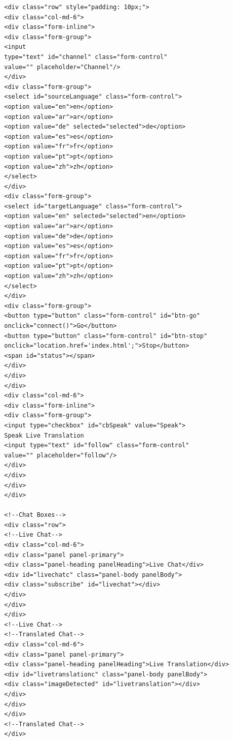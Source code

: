 \documentclass[english,runningheads,a4paper]{llncs}[2018/03/10]
\begin{document}
{\begin{verbatim}
        <div class="row" style="padding: 10px;">
        <div class="col-md-6">
        <div class="form-inline">
        <div class="form-group">
        <input 
        type="text" id="channel" class="form-control" 
        value="" placeholder="Channel"/>
        </div>
        <div class="form-group">
        <select id="sourceLanguage" class="form-control">
        <option value="en">en</option>
        <option value="ar">ar</option>
        <option value="de" selected="selected">de</option>
        <option value="es">es</option>
        <option value="fr">fr</option>
        <option value="pt">pt</option>
        <option value="zh">zh</option>
        </select>
        </div>
        <div class="form-group">
        <select id="targetLanguage" class="form-control">
        <option value="en" selected="selected">en</option>
        <option value="ar">ar</option>
        <option value="de">de</option>
        <option value="es">es</option>
        <option value="fr">fr</option>
        <option value="pt">pt</option>
        <option value="zh">zh</option>
        </select>
        </div>
        <div class="form-group">
        <button type="button" class="form-control" id="btn-go" 
        onclick="connect()">Go</button>
        <button type="button" class="form-control" id="btn-stop"
        onclick="location.href='index.html';">Stop</button>
        <span id="status"></span>
        </div>
        </div>
        </div>
        <div class="col-md-6">
        <div class="form-inline">
        <div class="form-group">
        <input type="checkbox" id="cbSpeak" value="Speak"> 
        Speak Live Translation
        <input type="text" id="follow" class="form-control" 
        value="" placeholder="follow"/>
        </div>
        </div>
        </div>
        </div>
        
        <!--Chat Boxes-->
        <div class="row">
        <!--Live Chat-->
        <div class="col-md-6">
        <div class="panel panel-primary">
        <div class="panel-heading panelHeading">Live Chat</div>
        <div id="livechatc" class="panel-body panelBody">
        <div class="subscribe" id="livechat"></div>
        </div>
        </div>
        </div>
        <!--Live Chat-->
        <!--Translated Chat-->
        <div class="col-md-6">
        <div class="panel panel-primary">
        <div class="panel-heading panelHeading">Live Translation</div>
        <div id="livetranslationc" class="panel-body panelBody">
        <div class="imageDetected" id="livetranslation"></div>
        </div>
        </div>
        </div>
        <!--Translated Chat-->
        </div>
        

\end{verbatim}}
\end{document}

